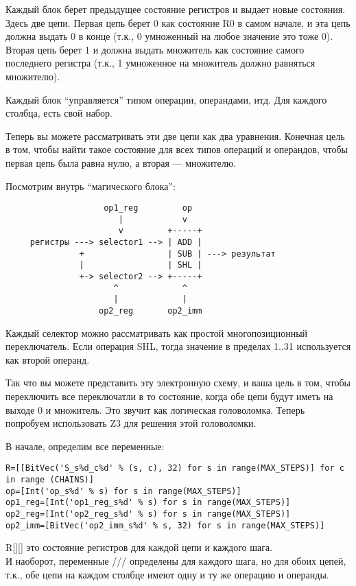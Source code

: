 Каждый блок берет предыдущее состояние регистров и выдает новые состояния.
Здесь две цепи.
Первая цепь берет 0 как состояние R0 в самом начале, и эта цепь должна выдать 0 в конце
(т.к., 0 умноженный на любое значение это тоже 0).
Вторая цепь берет 1 и должна выдать множитель как состояние самого последнего регистра
(т.к., 1 умноженное на множитель должно равняться множителю).

Каждый блок ``управляется'' типом операции, операндами, итд.
Для каждого столбца, есть свой набор.

Теперь вы можете рассматривать эти две цепи как два уравнения.
Конечная цель в том, чтобы найти такое состояние для всех типов операций и операндов, чтобы первая цепь
была равна нулю, а вторая --- множителю.

Посмотрим внутрь ``магического блока'':

\begin{lstlisting}
	                op1_reg         op
	                   |            v
	                   v         +-----+
	 регистры ---> selector1 --> | ADD |
	           +                 | SUB | ---> результат
	           |                 | SHL |
	           +-> selector2 --> +-----+
	                  ^             ^
	                  |             |
	               op2_reg       op2_imm
\end{lstlisting}

Каждый селектор можно рассматривать как простой многопозиционный переключатель.
Если операция SHL, тогда значение в пределах 1..31 используется как второй операнд.

Так что вы можете представить эту электронную схему, и ваша цель в том, чтобы переключить все переключатли в то состояние,
когда обе цепи будут иметь на выходе 0 и множитель.
Это звучит как логическая головоломка.
Теперь попробуем использовать Z3 для решения этой головоломки.

В начале, определим все переменные:

\begin{lstlisting}
R=[[BitVec('S_s%d_c%d' % (s, c), 32) for s in range(MAX_STEPS)] for c in range (CHAINS)]
op=[Int('op_s%d' % s) for s in range(MAX_STEPS)]
op1_reg=[Int('op1_reg_s%d' % s) for s in range(MAX_STEPS)]
op2_reg=[Int('op2_reg_s%d' % s) for s in range(MAX_STEPS)]
op2_imm=[BitVec('op2_imm_s%d' % s, 32) for s in range(MAX_STEPS)]
\end{lstlisting}

R[][] это состояние регистров для каждой цепи и каждого шага.\\
И наоборот, переменные /// определены для каждого шага, но для обоих цепей,
т.к., обе цепи на каждом столбце имеют одну и ту же операцию и операнды.

